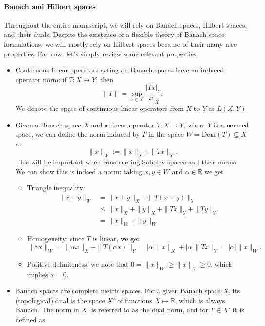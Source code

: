 \documentclass{article}
\newcommand{\R}{\mathbb{R}}
\begin{document}
\paragraph{Banach and Hilbert spaces} Throughout the entire manuscript, we will rely on Banach spaces, Hilbert spaces, and their duals. Despite the existence of a flexible theory of Banach space formulations, we will mostly rely on Hilbert spaces because of their many nice properties. For now, let's simply review some relevant properties: 
    \begin{itemize}
        \item Continuous linear operators acting on Banach spaces have an induced operator norm: if $T: X\mapsto Y$, then 
        $$ \| T\| =  \sup_{x\in X}\frac{|Tx|_Y}{|x|_X}. $$
        We denote the space of continuous linear operators from $X$ to $Y$ as $L(X,Y)$. 
        \item Given a Banach space $X$ and a linear operator $T:X\to Y$, where $Y$ is a normed space, we can define the norm induced by $T$ in the space $W=\text{Dom}(T)\subseteq X$ as
        $$ \|x\|_{W} := \|x\|_X + \|Tx\|_Y. $$
        This will be important when constructing Sobolev spaces and their norms. We can show this is indeed a norm: taking $x,y\in W$ and $\alpha\in \R$ we get
        \begin{itemize}
            \item Triangle inequality:
            \begin{align*}
                \|x+y\|_W &= \|x+y\|_X + \|T(x+y)\|_Y \\
                &\leq \|x\|_X + \|y\|_X + \|Tx\|_Y + \|Ty\|_Y \tag{$\|\cdot\|_X$ and $\|\cdot\|_Y$ are norms}\\
                &= \|x\|_W + \|y\|_W.
            \end{align*}
            \item Homogeneity: since $T$ is linear, we get 
            $$\|\alpha x\|_W = \|\alpha x\|_X + \|T(\alpha x)\|_Y = |\alpha|\|x\|_X + |\alpha|\|Tx\|_Y = |\alpha|\|x\|_W.$$
            \item Positive-definiteness: we note that $0=\|x\|_W\geq \|x\|_X\geq 0$, which implies $x=0$.
        \end{itemize}
        \item Banach spaces are complete metric spaces. For a given Banach space $X$, its (topological) dual is the space $X'$ of functions $X\mapsto \R$, which is always Banach. The norm in $X'$ is referred to as the dual norm, and for $T\in X'$ it is defined as 

\end{itemize}
\end{document}
